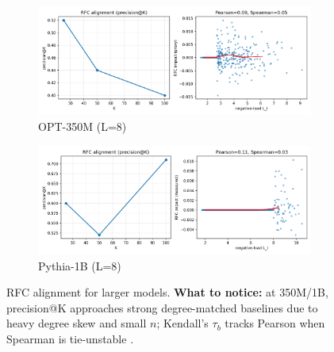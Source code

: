 \documentclass[11pt]{article}
\newcommand{\1}{\mathbf{1}}
\begin{document}
\begin{figure}[t]
\centering
\begin{subfigure}[t]{0.48\textwidth}
\includegraphics[width=\linewidth]{figs/rfc_alignment_facebook_opt-350m_residual_L8.png}
\caption{OPT-350M (L=8)}
\end{subfigure}\hfill
\begin{subfigure}[t]{0.48\textwidth}
\includegraphics[width=\linewidth]{figs/rfc_alignment_EleutherAI_pythia-1b_residual_L8.png}
\caption{Pythia-1B (L=8)}
\end{subfigure}
\caption{RFC alignment for larger models. \textbf{What to notice:} at 350M/1B, precision@K approaches strong degree-matched baselines due to heavy degree skew and small $n$; Kendall's $\tau_b$ tracks Pearson when Spearman is tie-unstable \citep{Kendall1938,Spearman1904}.}
\label{fig:rfc_alignment_panel_big}
\end{figure}
\end{document}
